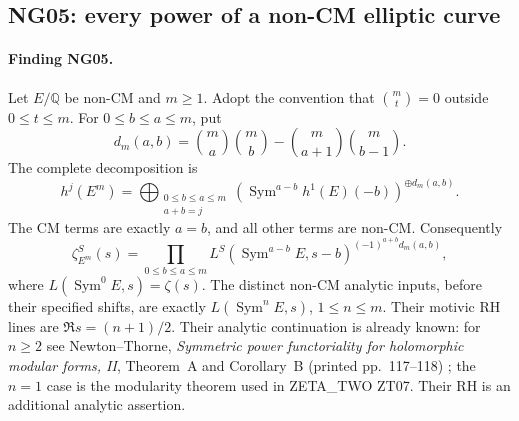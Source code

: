 \subsection{NG05: every power of a non-CM elliptic curve}
\label{NG05}

\paragraph{Finding NG05.}
Let $E/\mathbb Q$ be non-CM and $m\ge1$.  Adopt the convention that
$\binom m t=0$ outside $0\le t\le m$.  For $0\le b\le a\le m$, put
\[
 d_m(a,b)=\binom ma\binom mb-
                        \binom m{a+1}\binom m{b-1}.           \tag{NG05.1}
\]
The complete decomposition is
\[
 h^j(E^m)=\bigoplus_{\substack{0\le b\le a\le m\\a+b=j}}
       \left(\operatorname{Sym}^{a-b}h^1(E)(-b)\right)^{\oplus d_m(a,b)}.
                                                                    \tag{NG05.2}
\]
The CM terms are exactly $a=b$, and all other terms are non-CM.
Consequently
\[
 \zeta_{E^m}^S(s)=
 \prod_{0\le b\le a\le m}
 L^S(\operatorname{Sym}^{a-b}E,s-b)^{(-1)^{a+b}d_m(a,b)},       \tag{NG05.3}
\]
where $L(\operatorname{Sym}^0E,s)=\zeta(s)$.  The distinct non-CM
analytic inputs, before their specified shifts, are exactly
$L(\operatorname{Sym}^nE,s)$, $1\le n\le m$.  Their motivic RH lines
are $\Re s=(n+1)/2$.  Their analytic continuation is already known:
for $n\ge2$ see Newton--Thorne, \emph{Symmetric power functoriality
for holomorphic modular forms, II}, Theorem~A and Corollary~B
(printed pp.~117--118) \cite{NGNewtonThorne}; the $n=1$ case is the modularity theorem
used in ZETA\_TWO ZT07.  Their RH is an additional analytic assertion.

